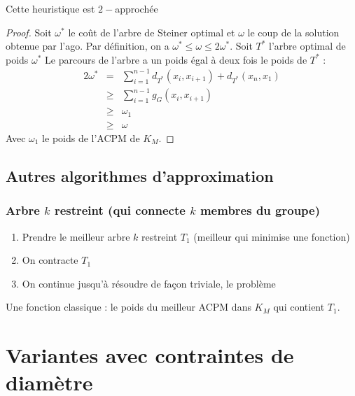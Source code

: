 \documentclass[a4paper,11pt]{thesis}
\begin{document}
\begin{thrm}
    Cette heuristique est $2-$approchée
\end{thrm}

\begin{proof}
    Soit $\omega^*$ le coût de l'arbre de Steiner optimal et $\omega$ le coup de la solution
    obtenue par l'ago. Par définition, on a $\omega^* \leq \omega \leq 2 \omega^*$. Soit $T^*$
    l'arbre optimal de poids $\omega^*$
    Le parcours de l'arbre a un poids égal à  deux fois le poids de $T^*$ :
    \begin{displaymath}
        \begin{array}{rcl}
            2 \omega^* & = & \sum_{i=1}^{n-1}d_{T^*}(x_i, x_{i+1}) + d_{T^*}(x_n, x_1) \\
                       & \geq & \sum_{i=1}^{n-1} g_G(x_i, x_{i+1}) \\
                       & \geq & \omega_1 \\
                       & \geq & \omega 
        \end{array}
    \end{displaymath}
    Avec $\omega_1$ le poids de l'ACPM de $K_M$.
\end{proof}

\subsection{Autres algorithmes d'approximation}

\subsubsection{Arbre $k$ restreint (qui connecte $k$ membres du groupe)}

\begin{enumerate}
    \item Prendre le meilleur arbre $k$ restreint $T_1$ (meilleur qui minimise une fonction)
    \item On contracte $T_1$
    \item On continue jusqu'à résoudre de façon triviale, le problème
\end{enumerate}

Une fonction classique : le poids du meilleur ACPM dans $K_M$ qui contient $T_1$.

\section{Variantes avec contraintes de diam\`{e}tre}
\end{document}
